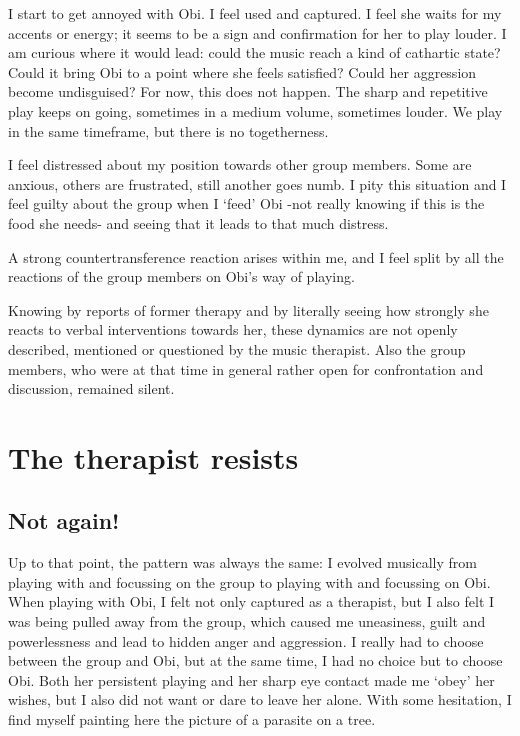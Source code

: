 \documentclass[authordate, empirical]{jote-new-article}
\begin{document}
I start to get annoyed with Obi. I feel used and captured. I feel she waits for my accents or energy; it seems to be a sign and confirmation for her to play louder. I am curious where it would lead: could the music reach a kind of cathartic state? Could it bring Obi to a point where she feels satisfied? Could her aggression become undisguised? For now, this does not happen. The sharp and repetitive play keeps on going, sometimes in a medium volume, sometimes louder. We play in the same timeframe, but there is no togetherness.



I feel distressed about my position towards other group members. Some are anxious, others are frustrated, still another goes numb. I pity this situation and I feel guilty about the group when I ‘feed' Obi -not really knowing if this is the food she needs- and seeing that it leads to that much distress.



A strong countertransference reaction arises within me, and I feel split by all the reactions of the group members on Obi's way of playing.



Knowing by reports of former therapy and by literally seeing how strongly she reacts to verbal interventions towards her, these dynamics are not openly described, mentioned or questioned by the music therapist. Also the group members, who were at that time in general rather open for confrontation and discussion, remained silent.


\section{The therapist resists}



\subsection{Not again!}



Up to that point, the pattern was always the same: I evolved musically from playing with and focussing on the group to playing with and focussing on Obi. When playing with Obi, I felt not only captured as a therapist, but I also felt I was being pulled away from the group, which caused me uneasiness, guilt and powerlessness and lead to hidden anger and aggression. I really had to choose between the group and Obi, but at the same time, I had no choice but to choose Obi. Both her persistent playing and her sharp eye contact made me ‘obey' her wishes, but I also did not want or dare to leave her alone. With some hesitation, I find myself painting here the picture of a parasite on a tree.
\end{document}
